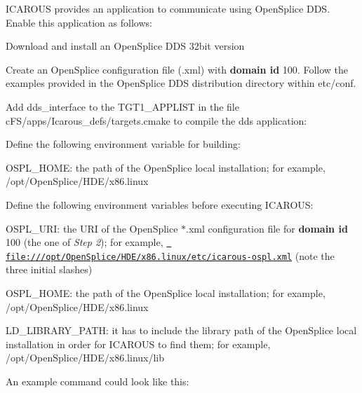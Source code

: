 ICAROUS provides an application to communicate using Open\+Splice DDS. Enable this application as follows\+:


\begin{DoxyEnumerate}
\item Download and install an Open\+Splice DDS 32bit version
\item Create an Open\+Splice configuration file (.xml) with {\bfseries{domain id}} 100. Follow the examples provided in the Open\+Splice DDS distribution directory within {\ttfamily etc/conf}.
\item Add {\ttfamily dds\+\_\+interface} to the {\ttfamily TGT1\+\_\+\+APPLIST} in the file {\ttfamily c\+FS/apps/\+Icarous\+\_\+defs/targets.\+cmake} to compile the dds application\+:
\item Define the following environment variable for building\+:
\begin{DoxyItemize}
\item {\ttfamily OSPL\+\_\+\+HOME}\+: the path of the Open\+Splice local installation; for example, {\ttfamily /opt/\+Open\+Splice/\+HDE/x86.linux}
\end{DoxyItemize}
\item Define the following environment variables before executing ICAROUS\+:
\begin{DoxyItemize}
\item {\ttfamily OSPL\+\_\+\+URI}\+: the URI of the Open\+Splice {\ttfamily $\ast$.xml} configuration file for {\bfseries{domain id}} 100 (the one of {\itshape Step 2}); for example, {\ttfamily \href{file:///opt/OpenSplice/HDE/x86.linux/etc/icarous-ospl.xml}{\texttt{ file\+:///opt/\+Open\+Splice/\+HDE/x86.\+linux/etc/icarous-\/ospl.\+xml}}} (note the three initial slashes)
\item {\ttfamily OSPL\+\_\+\+HOME}\+: the path of the Open\+Splice local installation; for example, {\ttfamily /opt/\+Open\+Splice/\+HDE/x86.linux}
\item {\ttfamily LD\+\_\+\+LIBRARY\+\_\+\+PATH}\+: it has to include the library path of the Open\+Splice local installation in order for ICAROUS to find them; for example, {\ttfamily /opt/\+Open\+Splice/\+HDE/x86.linux/lib}
\end{DoxyItemize}

An example command could look like this\+:
\end{DoxyEnumerate}


\begin{DoxyCode}{0}

\end{DoxyCode}
 